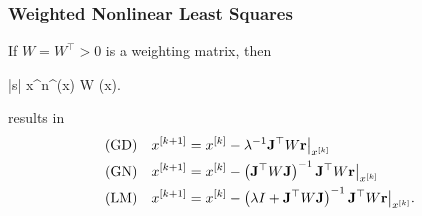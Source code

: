 \documentclass{beamer}
\begin{document}
\begin{frame}\frametitle{Weighted Nonlinear Least Squares}
	If $W=W^\top >0$ is a weighting matrix, then 
	\begin{mini*}|s|
		{x\in{}^n}{\rbf^\top(x) W \rbf(x)}{}{}.
	\end{mini*}
	results in
	\begin{align*}
		\text{(GD)} &\quad 	x^{[k+1]} = x^{[k]} - \lambda^{-1} \mathbf{J}^\top W \mathbf{r}\big|_{x^{[k]}} \\
		\text{(GN)} &\quad 	x^{[k+1]} = x^{[k]} - \left(\mathbf{J}^\top W \mathbf{J}\right)^{-1} \mathbf{J}^\top W \mathbf{r}\big|_{x^{[k]}} \\
		\text{(LM)} &\quad 	x^{[k+1]} = x^{[k]} - \left(\lambda I + \mathbf{J}^\top W \mathbf{J}\right)^{-1} \mathbf{J}^\top W \mathbf{r}\big|_{x^{[k]}}.		
	\end{align*}
\end{frame}
\end{document}
